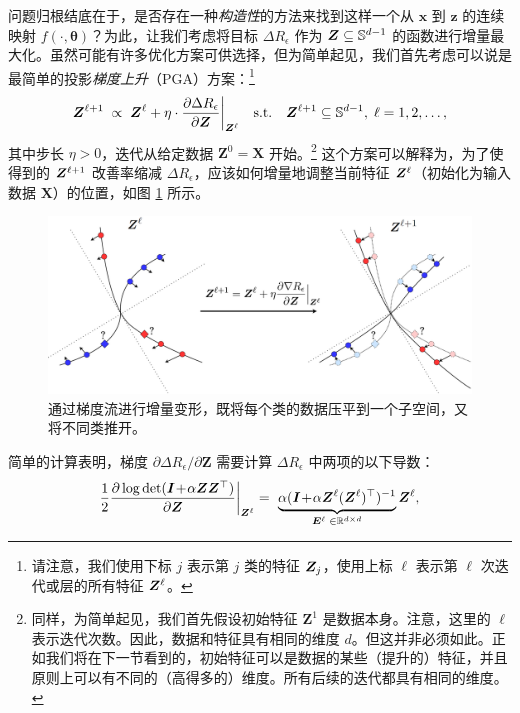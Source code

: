 \documentclass[../../book-main.tex]{subfiles}
\begin{document}
问题归根结底在于，是否存在一种{\em 构造性}的方法来找到这样一个从 $\bm x$ 到 $\bm z$ 的连续映射 $f(\cdot,\bm \theta)$？为此，让我们考虑将目标 $\Delta R_{\epsilon}$ 作为 $\bm{Z} \subseteq \mathbb{S}^{d-1}$ 的函数进行增量最大化。虽然可能有许多优化方案可供选择，但为简单起见，我们首先考虑可以说是最简单的投影{\em 梯度上升}（PGA）方案：\footnote{请注意，我们使用下标 $j$ 表示第 $j$ 类的特征 $\bm{Z}_j$，使用上标 $\ell$ 表示第 $\ell$ 次迭代或层的所有特征 $\bm{Z}^{\ell}$。}
\begin{equation}
\bm Z^{\ell+1}   \; \propto \; \bm Z^{\ell} + \eta \cdot \frac{\partial \Delta R_{\epsilon}}{\partial \bm Z}\bigg|_{\bm{Z}^{\ell}}
\quad \mbox{s.t.} \quad \bm{Z}^{\ell+1} \subseteq \mathbb{S}^{d-1}, \; \ell = 1, 2, \ldots,
\label{eqn:gradient-descent}
\end{equation}
其中步长 $\eta >0$，迭代从给定数据 $\bm Z^{0} = \bm X$ 开始。\footnote{同样，为简单起见，我们首先假设初始特征 $\bm Z^{1}$ 是数据本身。注意，这里的 $\ell$ 表示迭代次数。因此，数据和特征具有相同的维度 $d$。但这并非必须如此。正如我们将在下一节看到的，初始特征可以是数据的某些（提升的）特征，并且原则上可以有不同的（高得多的）维度。所有后续的迭代都具有相同的维度。}
这个方案可以解释为，为了使得到的 $\bm{Z}^{\ell +1}$ 改善率缩减 $\Delta R_{\epsilon}$，应该如何增量地调整当前特征 $\bm{Z}^\ell$（初始化为输入数据 $\bm X$）的位置，如图 \ref{fig:gradient-flow} 所示。
\begin{figure}
\centering
    \includegraphics[width=0.85\linewidth]{figs_chap4/redu_gradient_diagram.png}
    \caption{通过梯度流进行增量变形，既将每个类的数据压平到一个子空间，又将不同类推开。}
    \label{fig:gradient-flow}
\end{figure}


简单的计算表明，梯度 ${\partial \Delta R_{\epsilon}}/{\partial \bm Z}$ 需要计算 $\Delta R_{\epsilon}$ 中两项的以下导数：
\begin{equation}\label{eqn:expand-directions}
    \frac{1}{2}\frac{\partial \log \det (\bm{I} \!+\! \alpha \bm{Z} \bm{Z}^{\top} )}{\partial \bm Z}\bigg|_{\bm{Z}^\ell} = \,\, \underbrace{\alpha(\bm{I} \!+\! \alpha\bm{Z}^\ell (\bm{Z}^\ell)^\top)^{-1}}_{\bm E^{\ell} \; \in \mathbb{R}^{d\times d}}\bm{Z}^\ell,
\end{equation}
\end{document}
